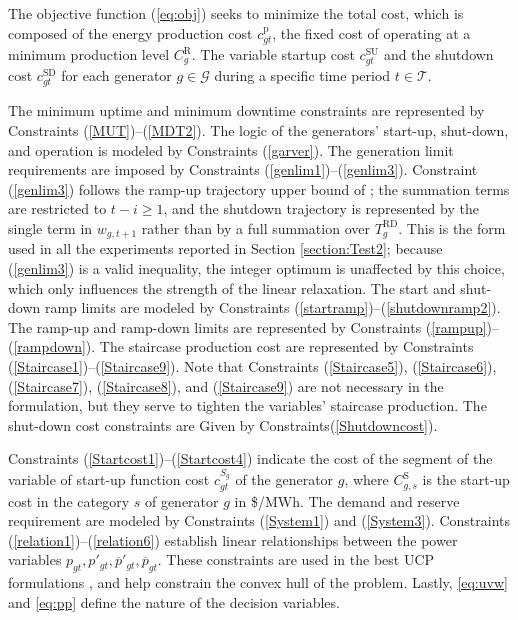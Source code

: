 The objective function (\ref{eq:obj}) seeks to minimize the total cost, which is composed of the energy production cost $c_{gt}^{\text{p}}$, the fixed cost of operating at a minimum production level $C_{g}^{\text{R}}$. The variable startup cost $c_{gt}^{\text{SU}}$ and  the shutdown cost $c_{gt}^{\text{SD}}$ for each generator $g\in\mathcal{G}$ during a specific time period $t\in\mathcal{T}$. 




The minimum uptime and minimum downtime constraints 
are represented by Constraints (\ref{MUT})--(\ref{MDT2}). The logic of the generators' start-up, shut-down, and operation is modeled by Constraints (\ref{garver}). The generation limit requirements are imposed by Constraints (\ref{genlim1})--(\ref{genlim3}).
Constraint (\ref{genlim3}) follows the ramp-up trajectory upper bound of \citet{Pan2016}; the summation terms are
restricted to $t-i\geq 1$, and the shutdown trajectory is represented by the single term in $w_{g,t+1}$ rather than by a
full summation over $T^{\text{RD}}_g$. This is the form used in all the experiments reported in Section \ref{section:Test2};
because (\ref{genlim3}) is a valid inequality, the integer optimum is unaffected by this choice, which only influences the
strength of the linear relaxation. The start and shut-down ramp limits are modeled by Constraints (\ref{startramp})--(\ref{shutdownramp2}). The ramp-up and ramp-down limits are represented by Constraints (\ref{rampup})--(\ref{rampdown}).
%
The staircase production cost are represented by 
Constraints (\ref{Staircase1})--(\ref{Staircase9}). Note that Constraints (\ref{Staircase5}), (\ref{Staircase6}), (\ref{Staircase7}), (\ref{Staircase8}), and (\ref{Staircase9}) are not necessary in the formulation, but they serve to tighten the variables' staircase production.
%
The shut-down cost constraints are Given by Constraints(\ref{Shutdowncost}).

Constraints (\ref{Startcost1})--(\ref{Startcost4}) indicate the cost of the segment of the variable of start-up function cost $c_{gt}^{S_g}$ of the generator $g$, where $C_{g,s}^{\text{S}}$ is the start-up cost in the category $s$ of generator $g$ in \$/MWh.
%
The demand and reserve requirement are modeled by Constraints (\ref{System1}) and (\ref{System3}). Constraints (\ref{relation1})--(\ref{relation6}) establish linear relationships between the power variables 
$p_{gt}, p'_{gt}, \overline{p}'_{gt},\overline{p}_{gt}$. These constraints are used in the best UCP formulations \citep{Knueven2020b}, and help constrain the convex hull of the problem.
%
Lastly, \eqref{eq:uvw} and \eqref{eq:pp}  define the nature of the decision variables.

